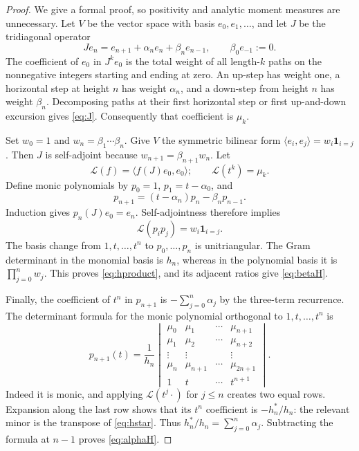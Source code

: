 \documentclass[11pt,letterpaper]{article}
\numberwithin{equation}{section}
\theoremstyle{definition}
\theoremstyle{remark}
\begin{document}
\begin{proof}
We give a formal proof, so positivity and analytic moment measures are
unnecessary. Let $V$ be the vector space with basis $e_0,e_1,\ldots$, and
let $J$ be the tridiagonal operator
\[
 Je_n=e_{n+1}+\alpha_ne_n+\beta_ne_{n-1},
 \qquad \beta_0e_{-1}:=0.
\]
The coefficient of $e_0$ in $J^ke_0$ is the total weight of all length-$k$
paths on the nonnegative integers starting and ending at zero. An up-step
has weight one, a horizontal step at height $n$ has weight $\alpha_n$,
and a down-step from height $n$ has weight $\beta_n$.
Decomposing paths at their first horizontal step or first up-and-down
excursion gives \eqref{eq:J}. Consequently that coefficient is $\mu_k$.

Set $w_0=1$ and $w_n=\beta_1\cdots\beta_n$. Give $V$ the symmetric
bilinear form $\langle e_i,e_j\rangle=w_i\mathbf1_{i=j}$. Then $J$ is
self-adjoint because $w_{n+1}=\beta_{n+1}w_n$. Let
\[
 \mathcal{L}(f)=\langle f(J)e_0,e_0\rangle;
 \qquad \mathcal{L}(t^k)=\mu_k.
\]
Define monic polynomials by $p_0=1$, $p_1=t-\alpha_0$, and
\[
 p_{n+1}=(t-\alpha_n)p_n-\beta_np_{n-1}.
\]
Induction gives $p_n(J)e_0=e_n$. Self-adjointness therefore implies
\[
 \mathcal{L}(p_ip_j)=w_i\mathbf1_{i=j}.
\]
The basis change from $1,t,\ldots,t^n$ to $p_0,\ldots,p_n$ is
unitriangular. The Gram determinant in the monomial basis is $h_n$,
whereas in the polynomial basis it is $\prod_{j=0}^n w_j$.
This proves \eqref{eq:hproduct}, and its adjacent ratios give
\eqref{eq:betaH}.

Finally, the coefficient of $t^n$ in $p_{n+1}$ is
$-\sum_{j=0}^n\alpha_j$ by the three-term recurrence. The determinant
formula for the monic polynomial orthogonal to $1,t,\ldots,t^n$ is
\[
 p_{n+1}(t)=\frac1{h_n}
 \begin{vmatrix}
 \mu_0&\mu_1&\cdots&\mu_{n+1}\\
 \mu_1&\mu_2&\cdots&\mu_{n+2}\\
 \vdots&\vdots&&\vdots\\
 \mu_n&\mu_{n+1}&\cdots&\mu_{2n+1}\\
 1&t&\cdots&t^{n+1}
 \end{vmatrix}.
\]
Indeed it is monic, and applying $\mathcal L(t^j\cdot)$ for $j\le n$
creates two equal rows. Expansion along the last row shows that its
$t^n$ coefficient is $-h_n^*/h_n$: the relevant minor is the transpose
of \eqref{eq:hstar}. Thus $h_n^*/h_n=\sum_{j=0}^n\alpha_j$.
Subtracting the formula at $n-1$ proves \eqref{eq:alphaH}.
\end{proof}
\end{document}
